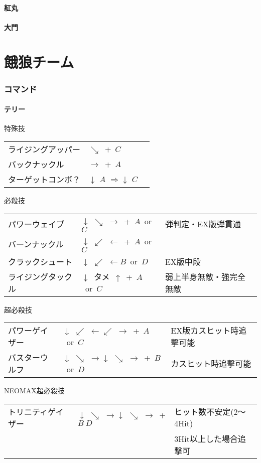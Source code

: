 \documentclass[a4j,11pt]{jarticle}
\def\hado{$\downarrow$ $\searrow$ $\rightarrow$}%
\def\tatsu{$\downarrow$ $\swarrow$ $\leftarrow$}%
\def\Cancel{$\Longrightarrow$}
\begin{document}
\subsection{紅丸}
\subsection{大門}
\newpage
\part{餓狼チーム}
\section{コマンド}
\subsection{テリー}
\begin{itembox}[l]{特殊技}
\begin{tabular}{lll}
ライジングアッパー&$\searrow$\ +\ $C$&\\
バックナックル&$\rightarrow$\ +\ $A$&\\
ターゲットコンボ？&$\downarrow$ $A$ \Cancel $\downarrow$ $C$
\end{tabular}
\end{itembox}
\begin{itembox}[l]{必殺技}
\begin{tabular}{lll}
パワーウェイブ&\hado\ +\ $A$\ or\ $C$&弾判定・EX版弾貫通\\
バーンナックル&\tatsu\ +\ $A$\ or\ $C$&\\
クラックシュート&\tatsu $B$\ or\ $D$&EX版中段\\
ライジングタックル&$\downarrow$\ タメ\ $\uparrow$\ +\ $A$\ or\ $C$&弱上半身無敵・強完全無敵
\end{tabular}
\end{itembox}
\begin{itembox}[l]{超必殺技}
\begin{tabular}{lll}
パワーゲイザー&\tatsu $\swarrow$ $\rightarrow$\ +\ $A$\ or\ $C$&EX版カスヒット時追撃可能\\
バスターウルフ&\hado\hado\ +\ $B$\ or\ $D$&カスヒット時追撃可能
\end{tabular}
\end{itembox}
\begin{itembox}[l]{NEOMAX超必殺技}
\begin{tabular}{lll}
トリニティゲイザー&\hado\hado\ +$B\ D$&ヒット数不安定(2～4Hit)\\
&&3Hit以上した場合追撃可
\end{tabular}
\end{itembox}
\newpage
\end{document}

